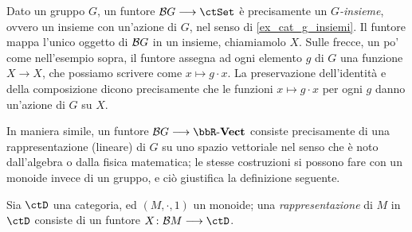 \begin{example}\label{exa_azioni_funtori}
 Dato un gruppo \(G\), un funtore \(\susp G\fun\ctSet\) è precisamente un \emph{\(G\)-insieme}, ovvero un insieme con un'azione di \(G\), nel senso di \ref{ex_cat_g_insiemi}.
 Il funtore mappa l'unico oggetto di \(\mathcal{B} G\) in un insieme, chiamiamolo \(X\).
 Sulle frecce, un po' come nell'esempio sopra, il funtore assegna ad ogni elemento \(g\) di \(G\) una funzione \(X\to X\), che possiamo scrivere come \(x\mapsto g\cdot x\).
 La preservazione dell'identità e della composizione dicono precisamente che le funzioni \(x\mapsto g\cdot x\) per ogni \(g\) danno un'azione di \(G\) su \(X\).

\end{example}
In maniera simile, un funtore \(\susp G\fun\ctVect[\bbR]\) consiste precisamente di una rappresentazione (lineare) di \(G\) su uno spazio vettoriale nel senso che è noto dall'algebra o dalla fisica matematica; le stesse costruzioni si possono fare con un monoide invece di un gruppo, e ciò giustifica la definizione seguente.
\begin{definition}[Rappresentazione di \(M\)]\label{es_fun_repre}
 Sia \(\ctD\) una categoria, ed \((M,\cdot,1)\) un monoide; una \emph{rappresentazione} di \(M\) in \(\ctD\) consiste di un funtore \(X \colon \susp M \fun \ctD\).
\end{definition}
